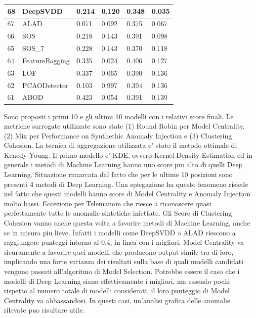 \begin{table}[H]
\begin{minipage}{.5\textwidth}
{\begin{tabular}{|l|l|l|l|l|l|}
\hline
68          & DeepSVDD       & 0.214       & 0.120        & 0.348       & 0.035             \\ 
\hline
67          & ALAD           & 0.071       & 0.092        & 0.375       & 0.067             \\ 
\hline
66          & SOS            & 0.218       & 0.143        & 0.391       & 0.098             \\ 
\hline
65          & SOS\_7         & 0.228       & 0.143        & 0.370       & 0.118             \\ 
\hline
64          & FeatureBagging & 0.335       & 0.024        & 0.406       & 0.127             \\ 
\hline
63          & LOF            & 0.337       & 0.065        & 0.390       & 0.136             \\ 
\hline
62          & PCAODetector   & 0.103       & 0.997        & 0.394       & 0.136             \\ 
\hline
61          & ABOD           & 0.423       & 0.054        & 0.391       & 0.139             \\
\hline
\end{tabular}}
    \end{minipage}
  \end{table}




Sono proposti i primi 10 e gli ultimi 10 modelli con i relativi score finali. Le metriche surrogate utilizzate sono state (1) Round Robin per Model Centrality, (2) Mix per Performance on Synthethic Anomaly Injection e (3) Clustering Cohesion. La tecnica di aggregazione utilizzata e' stato il metodo ottimale di Kenedy-Young.
Il primo modello e' KDE, ovvero Kernel Density Estimation ed in generale i metodi di Machine Learning hanno uno score piu alto di quelli Deep Learning. Situazione rimarcata dal fatto che per le ultime 10 posizioni sono presenti 4 metodi di Deep Learning. Una spiegazione ha questo fenomeno risiede nel fatto che questi modelli hanno score di Model Centrality e Anomaly Injection molto bassi. Eccezione per Telemanom che riesce a riconoscere quasi perfettamente tutte le anomalie sintetiche iniettate. Gli Score di Clustering Cohesion vanno anche questa volta a favorire metodi di Machine Learning, anche se in misura piu lieve. Infatti i modelli come DeepSVDD o ALAD riescono a  raggiungere punteggi intorno al 0.4, in linea con i migliori.
Model Centrality va sicuramente a favorire quei modelli che producono output simile tra di loro, implicando una forte varianza dei risultati sulla base di quali modelli candidati vengono passati all'algoritmo di Model Selection. Potrebbe essere il caso che i modelli di Deep Learning siano effettivamente i migliori, ma essendo pochi rispetto al numero totale di modelli considerati, il loro punteggio di Model Centrality va abbassandosi. In questi casi, un'analisi grafica delle anomalie rilevate puo risultare utile.

